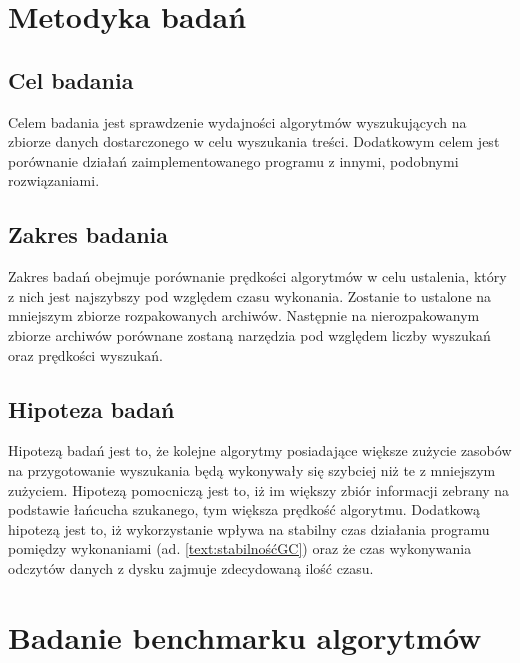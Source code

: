 \section{Metodyka badań}

\subsection{Cel badania}

Celem badania jest sprawdzenie wydajności algorytmów wyszukujących na zbiorze
danych dostarczonego w celu wyszukania treści. Dodatkowym celem jest porównanie
działań zaimplementowanego programu z innymi, podobnymi rozwiązaniami.

\subsection{Zakres badania}

Zakres badań obejmuje porównanie prędkości algorytmów w celu ustalenia, który
z nich jest najszybszy pod względem czasu wykonania. Zostanie to ustalone na
mniejszym zbiorze rozpakowanych archiwów. Następnie na nierozpakowanym zbiorze
archiwów porównane zostaną narzędzia pod względem liczby wyszukań oraz prędkości
wyszukań.

\subsection{Hipoteza badań}

Hipotezą badań jest to, że kolejne algorytmy posiadające większe zużycie zasobów
na przygotowanie wyszukania będą wykonywały się szybciej niż te z mniejszym
zużyciem. Hipotezą pomocniczą jest to, iż im większy zbiór informacji zebrany
na podstawie łańcucha szukanego, tym większa prędkość algorytmu. Dodatkową hipotezą jest
to, iż wykorzystanie  wpływa na stabilny czas
działania programu pomiędzy wykonaniami (ad. \ref{text:stabilnośćGC}) oraz że czas wykonywania odczytów danych z dysku zajmuje
zdecydowaną ilość czasu.

\section{Badanie benchmarku algorytmów}

